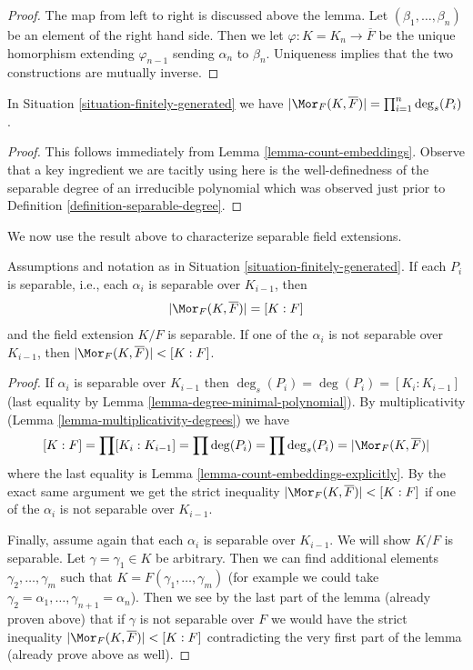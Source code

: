 \begin{proof}
The map from left to right is discussed above the lemma.
Let $(\beta_1, \ldots, \beta_n)$ be an element of the right hand side.
Then we let $\varphi : K = K_n \to \overline{F}$ be the unique homorphism
extending $\varphi_{n - 1}$ sending $\alpha_n$ to $\beta_n$.
Uniqueness implies that the two constructions are mutually inverse.
\end{proof}

\begin{lemma}
\label{lemma-count-embeddings-explicitly}
In Situation \ref{situation-finitely-generated} we have
$|\Mor_F(K, \overline{F})| = \prod_{i = 1}^n \deg_s(P_i)$.
\end{lemma}

\begin{proof}
This follows immediately from Lemma \ref{lemma-count-embeddings}.
Observe that a key ingredient we are tacitly using here is the
well-definedness of the separable degree of an irreducible polynomial
which was observed just prior to
Definition \ref{definition-separable-degree}.
\end{proof}

\noindent
We now use the result above to characterize separable field extensions.

\begin{lemma}
\label{lemma-separably-generated-separable}
Assumptions and notation as in Situation \ref{situation-finitely-generated}.
If each $P_i$ is separable, i.e., each $\alpha_i$ is separable over
$K_{i - 1}$, then
$$
|\Mor_F(K, \overline{F})| = [K : F]
$$
and the field extension $K/F$ is separable. If one of the $\alpha_i$ is
not separable over $K_{i - 1}$, then
$|\Mor_F(K, \overline{F})| < [K : F]$.
\end{lemma}

\begin{proof}
If $\alpha_i$ is separable over $K_{i - 1}$ then
$\deg_s(P_i) = \deg(P_i) = [K_i : K_{i - 1}]$
(last equality by Lemma \ref{lemma-degree-minimal-polynomial}).
By multiplicativity (Lemma \ref{lemma-multiplicativity-degrees}) we have
$$
[K : F] = \prod [K_i : K_{i - 1}] = \prod \deg(P_i) =
\prod \deg_s(P_i) = |\Mor_F(K, \overline{F})|
$$
where the last equality is Lemma \ref{lemma-count-embeddings-explicitly}.
By the exact same argument we get the strict inequality
$|\Mor_F(K, \overline{F})| < [K : F]$ if one of the $\alpha_i$ is
not separable over $K_{i - 1}$.

\medskip\noindent
Finally, assume again that each $\alpha_i$ is separable over $K_{i - 1}$.
We will show $K/F$ is separable.
Let $\gamma = \gamma_1 \in K$ be arbitrary. Then we can find additional
elements $\gamma_2, \ldots, \gamma_m$ such that
$K = F(\gamma_1, \ldots, \gamma_m)$ (for example we could take
$\gamma_2 = \alpha_1, \ldots, \gamma_{n + 1} = \alpha_n$).
Then we see by the last part of the lemma (already proven above)
that if $\gamma$ is not separable over $F$ we would have the
strict inequality $|\Mor_F(K, \overline{F})| < [K : F]$
contradicting the very first part of the lemma (already prove above
as well).
\end{proof}

